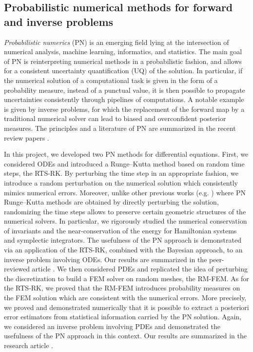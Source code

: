 \documentclass[10pt]{article}
\begin{document}
\subsection{Probabilistic numerical methods for forward and inverse problems}\label{sec:Giacomo}

\textit{Probabilistic numerics} (PN) is an emerging field lying at the intersection of numerical analysis, machine learning, informatics, and statistics. The main goal of PN is reinterpreting numerical methods in a probabilistic fashion, and allows for a consistent uncertainty quantification (UQ) of the solution. In particular, if the numerical solution of a computational task is given in the form of a probability measure, instead of a punctual value, it is then possible to propagate uncertainties consistently through pipelines of computations. A notable example is given by inverse problems, for which the replacement of the forward map by a traditional numerical solver can lead to biased and overconfident posterior measures. The principles and a literature of PN are summarized in the recent review papers \cite{COS19,HOG15,OaS19}.

In this project, we developed two PN methods for differential equations. First, we considered ODEs and introduced a Runge--Kutta method based on random time steps, the RTS-RK. By perturbing the time step in an appropriate fashion, we introduce a random perturbation on the numerical solution which consistently mimics numerical errors. Moreover, unlike other previous works (e.g. \cite{CGS17}) where PN Runge--Kutta methods are obtained by directly perturbing the solution, randomizing the time steps allows to preserve certain geometric structures of the numerical solvers. In particular, we rigorously studied the numerical conservation of invariants and the near-conservation of the energy for Hamiltonian systems and symplectic integrators. The usefulness of the PN approach is demonstrated via an application of the RTS-RK, combined with the Bayesian approach, to an inverse problem involving ODEs. Our results are summarized in the peer-reviewed article \cite{AbG20}. We then considered PDEs and replicated the idea of perturbing the discretization to build a FEM solver on random meshes, the RM-FEM. As for the RTS-RK, we proved that the RM-FEM introduces probability measures on the FEM solution which are consistent with the numerical errors. More precisely, we proved and demonstrated numerically that it is possible to extract a posteriori error estimators from statistical information carried by the PN solution. Again, we considered an inverse problem involving PDEs and demonstrated the usefulness of the PN approach in this context. Our results are summarized in the research article \cite{AbG21}.
\end{document}
